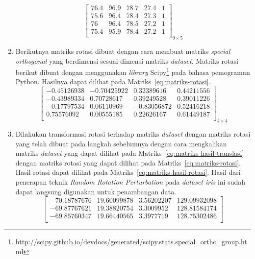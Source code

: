 \begin{enumerate}
\begin{equation}
\begin{bmatrix}
            76.4&96.9&78.7&27.4&1 \\
            75.6&96.4&78.4&27.3&1 \\
            76&96.4&78.5&27.2&1 \\
            75.4&95.9&78.4&27.2&1 \\
        \end{bmatrix}_{9\times 5}
    \end{equation}
    \item Berikutnya matriks rotasi dibuat dengan cara membuat matriks \textit{special orthogonal} yang berdimensi sesuai dimensi matriks \textit{dataset}. Matriks rotasi berikut dibuat dengan menggunakan \textit{library} Scipy\footnote{http://scipy.github.io/devdocs/generated/scipy.stats.special\_ortho\_group.html} pada bahasa pemograman Python. Hasilnya dapat dilihat pada Matriks~\ref{eq:matriks-rotasi}.
    \begin{equation}\label{eq:matriks-rotasi}
        \begin{bmatrix}
            -0.45126938		&		-0.70425922		&		 0.32389616		&		0.44211556 \\
            -0.43989334		&		 0.70728617		&		 0.39249528		&		0.39011226 \\
            -0.17797534		&		 0.06110969		&		-0.83056872		&		0.52416218 \\
             0.75576092		&		 0.00555185		&		 0.22626167		&		0.61449187 \\
        \end{bmatrix}_{4\times 4}
    \end{equation}
    \item Dilakukan transformasi rotasi terhadap matriks \textit{dataset} dengan matriks rotasi yang telah dibuat pada langkah sebelumnya dengan cara mengkalikan matriks \textit{dataset} yang dapat dilihat pada Matriks~\ref{eq:matriks-hasil-translasi} dengan matriks rotasi yang dapat dilihat pada Matriks~\ref{eq:matriks-rotasi}. Hasil rotasi dapat dilihat pada Matriks~\ref{eq:matriks-hasil-rotasi}. Hasil dari penerapan teknik \textit{Random Rotation Perturbation} pada \textit{dataset iris} ini sudah dapat langsung digunakan untuk penambangan data.
    \begin{equation}\label{eq:matriks-hasil-rotasi}
        \begin{bmatrix}
            -70.18787676&19.60099878&3.56202207&129.09932098 \\
            -69.87767621&19.38820754&3.3009952&128.81584174 \\
            -69.85760347&19.66440565&3.3977719&128.75302486 \\

\end{bmatrix}
\end{equation}
\end{enumerate}

